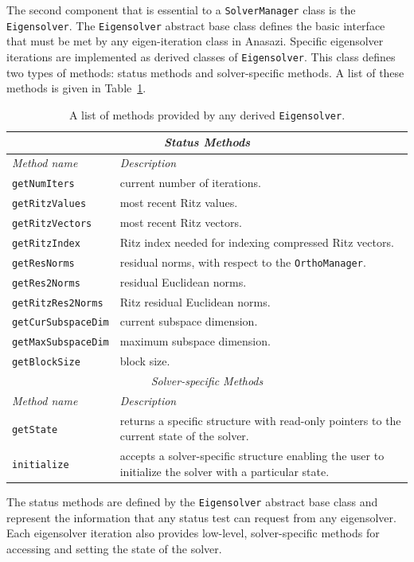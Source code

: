 \documentclass[acmtoms]{acmtrans2m}
\newcommand{\aspace}[1]{\texttt{#1}}
\begin{document}
The second component that is essential to a \aspace{SolverManager} class is the \aspace{Eigensolver}.
The \aspace{Eigensolver} abstract base class defines the basic interface that must be met
by any eigen-iteration class in Anasazi. Specific eigensolver iterations are implemented as derived
classes of \aspace{Eigensolver}.  This class
defines two types of methods: status methods and
solver-specific methods. A list of these methods is given in Table~\ref{tab:anasazi:itermethods}.
\begin{table}[htp]
\begin{center}
\caption{A list of methods provided by any derived
\aspace{Eigensolver}.} \label{tab:anasazi:itermethods}
\begin{tabular}{| p{3cm} | p{6cm} |}
\hline
\multicolumn{2}{|c|}{\emph{Status Methods}} \\
\hline
\emph{Method name} & \emph{Description} \\
\hline
{\tt getNumIters}       & current number of iterations. \\
{\tt getRitzValues}     & most recent Ritz values. \\
{\tt getRitzVectors}    & most recent Ritz vectors. \\
{\tt getRitzIndex}      & Ritz index needed for indexing compressed Ritz vectors. \\
{\tt getResNorms}       & residual norms, with respect to the \aspace{OrthoManager}. \\
{\tt getRes2Norms}      & residual Euclidean norms. \\
{\tt getRitzRes2Norms}  & Ritz residual  Euclidean norms. \\
{\tt getCurSubspaceDim} & current subspace dimension. \\
{\tt getMaxSubspaceDim} & maximum subspace dimension. \\
{\tt getBlockSize}      & block size. \\
\hline
\multicolumn{2}{|c|}{\emph{Solver-specific Methods}} \\
\hline
\emph{Method name} & \emph{Description} \\
\hline
{\tt getState}       & returns a specific structure with read-only pointers to
                       the current state of the solver. \\
{\tt initialize}     & accepts a solver-specific structure enabling the user to initialize
                       the solver with a particular state.\\
\hline
\end{tabular}
\end{center}
\end{table}
The status methods are defined by the \aspace{Eigensolver}
abstract base class and represent the information that any status test can request from
any eigensolver.  Each eigensolver iteration also provides low-level, 
solver-specific methods for accessing and setting the state of the solver.
\end{document}
